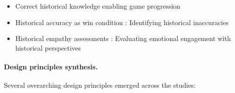 \documentclass[a4paper,fleqn]{cas-sc}
\begin{document}
\begin{enumerate}[noitemsep]
\begin{itemize}[noitemsep]
 \item Correct historical knowledge enabling game progression \citep{1Barbatsis201159, 24Ghannem2019, 52Lin2011265, 62Milosz201896, 79Fernes2024379}
 
 \item Historical accuracy as win condition \citep{25Repantis2011502}: Identifying historical inaccuracies
 
 \item Historical empathy assessments \citep{12Gilbert2019108, 45Yu2016727}: Evaluating emotional engagement with historical perspectives
\end{itemize}
\end{enumerate}


\paragraph{Design principles synthesis.}

Several overarching design principles emerged across the studies:
\end{document}
